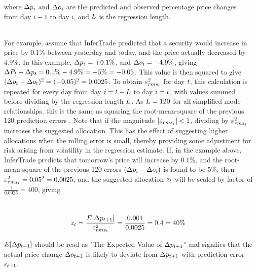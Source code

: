 {    
    \justify where $\Delta p_{i}$ and $\Delta o_{i}$ are the predicted and observed percentage price changes from day $i-1$ to day $i$, and $L$ is the regression length. 
    
    \\ %
    \vspace{1mm}
    \justify For example, assume that InferTrade predicted that a security would increase in price by $0.1\%$ between yesterday and today, and the price actually decreased by $4.9\%$. In this example, $\Delta p_{t} = +0.1\%$, and $\Delta o_{t} = -4.9\%$, giving $\Delta P_{t} - \Delta p_{t} = 0.1\% - 4.9\% = -5\% = -0.05$. This value is then squared to give $(\Delta p_{t} - \Delta o_{t})^{2} = (-0.05)^2 = 0.0025$. To obtain $\varepsilon^{{2}}_{rms_{t}}$ for day $t$, this calculation is repeated for every day from day $i = t-L$ to day $i = t$, with values summed before dividing by the regression length $L$. As $L = 120$ for all simplified mode relationships, this is the same as squaring the root-mean-square of the previous 120 prediction errors .
    \vspace{1mm}
    \justify Note that if the magnitude $|\varepsilon_{rms_{t}}| < 1$, dividing by $\varepsilon^{{2}}_{rms_{t}}$ increases the suggested allocation. This has the effect of suggesting higher allocations when the rolling error is small, thereby providing some adjustment for risk arising from volatility in the regression estimate. If, in the example above, InferTrade predicts that tomorrow's price will increase by $0.1\%$, and the root-mean-square of the previous 120 errors $(\Delta p_{i} - \Delta o_{i})$ is found to be $5\%$, then $\varepsilon^{{2}}_{rms_{t}} = 0.05^2 = 0.0025$, and the suggested allocation $z_t$ will be scaled by factor of $\frac{1}{0.0025} = 400$, giving
    
    \\ %
    \vspace{1mm}
    \begin{equation}
    z_t = \frac{E[\Delta p_{t+1}]}{\varepsilon^{{2}}_{rms_{t}}} = \frac{0.001}{0.0025} = 0.4 = 40 \%
    \end{equation}
    
    \vspace{1mm}
    \justify $E[\Delta p_{t+1}]$ should be read as "The Expected Value of $\Delta p_{t+1}$" and signifies that the actual price change $\Delta o_{t+1}$ is likely to deviate from $\Delta p_{t+1}$ with prediction error $\epsilon_{t+1}$.
}


